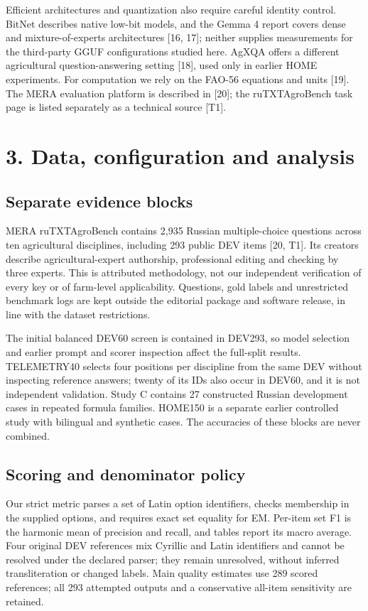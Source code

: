 \documentclass[10pt,a4paper]{article}
\begin{document}
Efficient architectures and quantization also require careful identity control. BitNet describes native low-bit models, and the Gemma 4 report covers dense and mixture-of-experts architectures [16, 17]; neither supplies measurements for the third-party GGUF configurations studied here. AgXQA offers a different agricultural question-answering setting [18], used only in earlier HOME experiments. For computation we rely on the FAO-56 equations and units [19]. The MERA evaluation platform is described in [20]; the ruTXTAgroBench task page is listed separately as a technical source [T1].

\section*{3. Data, configuration and analysis}
\subsection*{Separate evidence blocks}
MERA ruTXTAgroBench contains 2,935 Russian multiple-choice questions across ten agricultural disciplines, including 293 public DEV items [20, T1]. Its creators describe agricultural-expert authorship, professional editing and checking by three experts. This is attributed methodology, not our independent verification of every key or of farm-level applicability. Questions, gold labels and unrestricted benchmark logs are kept outside the editorial package and software release, in line with the dataset restrictions.

The initial balanced DEV60 screen is contained in DEV293, so model selection and earlier prompt and scorer inspection affect the full-split results. TELEMETRY40 selects four positions per discipline from the same DEV without inspecting reference answers; twenty of its IDs also occur in DEV60, and it is not independent validation. Study C contains 27 constructed Russian development cases in repeated formula families. HOME150 is a separate earlier controlled study with bilingual and synthetic cases. The accuracies of these blocks are never combined.

\subsection*{Scoring and denominator policy}
Our strict metric parses a set of Latin option identifiers, checks membership in the supplied options, and requires exact set equality for EM. Per-item set F1 is the harmonic mean of precision and recall, and tables report its macro average. Four original DEV references mix Cyrillic and Latin identifiers and cannot be resolved under the declared parser; they remain unresolved, without inferred transliteration or changed labels. Main quality estimates use 289 scored references; all 293 attempted outputs and a conservative all-item sensitivity are retained.
\end{document}
